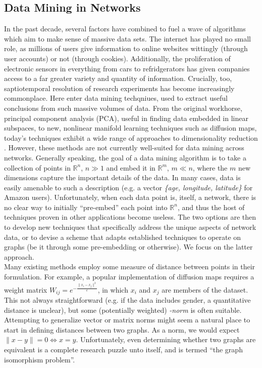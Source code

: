 \documentclass[11pt]{article}
\begin{document}
\subsection{Data Mining in Networks}
In the past decade, several factors have combined to fuel a wave of algorithms which aim to make sense of massive data sets. The internet has played no small role, as millions of users give information to online websites wittingly (through user accounts) or not (through cookies). Additionally, the proliferation of electronic sensors in everything from cars to refridgerators has given companies access to a far greater variety and quantity of information. Crucially, too, saptiotemporal resolution of research experiments has become increasingly commonplace. Here enter data mining techqniues, used to extract useful conclusions from such massive volumes of data. From the original workhorse, principal component analysis (PCA), useful in finding data embedded in linear subspaces, to new, nonlinear manifold learning techniques such as diffusion maps, today's techniques exhibit a wide range of approaches to dimensionality reduction \cite{data mining papers}. However, these methods are not currently well-suited for data mining across networks. Generally speaking, the goal of a data mining algorithm is to take a collection of points in $\mathbb{R}^{n}$, $n\gg1$ and embed it in $\mathbb{R}^{m}$, $m \ll n$, where the $m$ new dimensions capture the important details of the data. In many cases, data is easily amenable to such a description (e.g. a vector \textit{\{age, longitude, latitude\}} for Amazon users). Unfortunately, when each data point is, itself, a network, there is no clear way to initially ``pre-embed'' each point into $\mathbb{R}^{n}$, and thus the host of techniques proven in other applications become useless. The two options are then to develop new techniques that specifically address the unique aspects of network data, or to devise a scheme that adapts established techniques to operate on graphs (be it through some pre-embedding or otherwise). We focus on the latter approach. \vspace{1mm}\\
Many existing methods employ some measure of distance between points in their formulation. For example, a popular implementation of diffusion maps requires a weight matrix $W_{ij}=e^{-\frac{\|x_{i}-x_{j}\|^{2}}{\epsilon}}$, in which $x_{i}$ and $x_{j}$ are members of the dataset. This not always straightforward (e.g. if the data includes gender, a quantitative distance is unclear), but some (potentially weighted) \textit{-norm} is often suitable. Attempting to generalize vector or matrix norms might seem a natural place to start in defining distances between two graphs. As a norm, we would expect $\| x - y \| = 0 \Leftrightarrow x = y$. Unfortunately, even determining whether two graphs are equivalent is a complete research puzzle unto itself, and is termed ``the graph isomorphism problem''.
\end{document}
